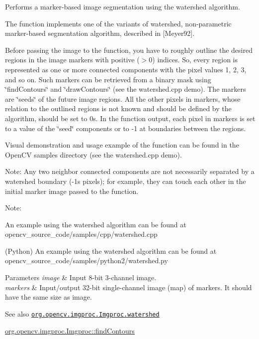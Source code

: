 Performs a marker-\/based image segmentation using the watershed algorithm.

The function implements one of the variants of watershed, non-\/parametric marker-\/based segmentation algorithm, described in \mbox{[}Meyer92\mbox{]}.

Before passing the image to the function, you have to roughly outline the desired regions in the image {\ttfamily markers} with positive ({\ttfamily $>$0}) indices. So, every region is represented as one or more connected components with the pixel values 1, 2, 3, and so on. Such markers can be retrieved from a binary mask using \char`\"{}find\+Contours\char`\"{} and \char`\"{}draw\+Contours\char`\"{} (see the {\ttfamily watershed.\+cpp} demo). The markers are \char`\"{}seeds\char`\"{} of the future image regions. All the other pixels in {\ttfamily markers}, whose relation to the outlined regions is not known and should be defined by the algorithm, should be set to 0\textquotesingle{}s. In the function output, each pixel in markers is set to a value of the \char`\"{}seed\char`\"{} components or to -\/1 at boundaries between the regions.

Visual demonstration and usage example of the function can be found in the Open\+CV samples directory (see the {\ttfamily watershed.\+cpp} demo).

Note\+: Any two neighbor connected components are not necessarily separated by a watershed boundary (-\/1\textquotesingle{}s pixels); for example, they can touch each other in the initial marker image passed to the function.

Note\+:


\begin{DoxyItemize}
\item An example using the watershed algorithm can be found at opencv\+\_\+source\+\_\+code/samples/cpp/watershed.\+cpp 
\item (Python) An example using the watershed algorithm can be found at opencv\+\_\+source\+\_\+code/samples/python2/watershed.\+py 
\end{DoxyItemize}


\begin{DoxyParams}{Parameters}
{\em image} & Input 8-\/bit 3-\/channel image. \\
\hline
{\em markers} & Input/output 32-\/bit single-\/channel image (map) of markers. It should have the same size as {\ttfamily image}.\\
\hline
\end{DoxyParams}
\begin{DoxySeeAlso}{See also}
\href{http://docs.opencv.org/modules/imgproc/doc/miscellaneous_transformations.html#watershed}{\tt org.\+opencv.\+imgproc.\+Imgproc.\+watershed} 

\mbox{\hyperlink{classorg_1_1opencv_1_1imgproc_1_1_imgproc_a60284da5baddfe0b44c6553177de8bf9}{org.\+opencv.\+imgproc.\+Imgproc\+::find\+Contours}} 
\end{DoxySeeAlso}



